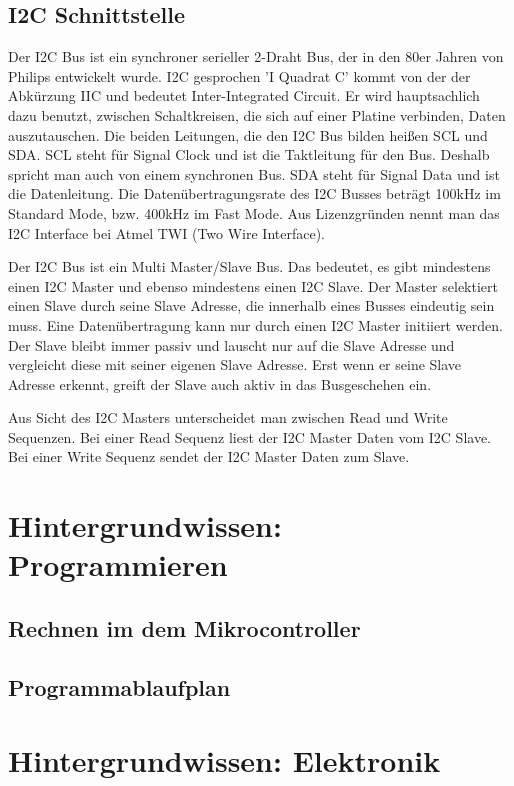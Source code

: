\section{I2C Schnittstelle}

Der I2C Bus ist ein synchroner serieller 2-Draht Bus, der in den 80er Jahren von Philips entwickelt wurde. I2C gesprochen 'I Quadrat C' kommt von der der Abkürzung IIC und bedeutet Inter-Integrated Circuit. Er wird hauptsachlich dazu benutzt, zwischen Schaltkreisen, die sich auf einer Platine verbinden, Daten auszutauschen. Die beiden Leitungen, die den I2C Bus bilden heißen SCL und SDA. SCL steht für Signal Clock und ist die Taktleitung für den Bus. Deshalb spricht man auch von einem synchronen Bus. SDA steht für Signal Data und ist die Datenleitung. Die Datenübertragungsrate des I2C Busses beträgt 100kHz im Standard Mode, bzw. 400kHz im Fast Mode. Aus Lizenzgründen nennt man das I2C Interface bei Atmel TWI (Two Wire Interface).

Der I2C Bus ist ein Multi Master/Slave Bus. Das bedeutet, es gibt mindestens einen I2C Master und ebenso mindestens einen I2C Slave. Der Master selektiert einen Slave durch seine Slave Adresse, die innerhalb eines Busses eindeutig sein muss. Eine Datenübertragung kann nur durch einen I2C Master initiiert werden. Der Slave bleibt immer passiv und lauscht nur auf die Slave Adresse und vergleicht diese mit seiner eigenen Slave Adresse. Erst wenn er seine Slave Adresse erkennt, greift der Slave auch aktiv in das Busgeschehen ein.

Aus Sicht des I2C Masters unterscheidet man zwischen Read und Write Sequenzen. Bei einer Read Sequenz liest der I2C Master Daten vom I2C Slave. Bei einer Write Sequenz sendet der I2C Master Daten zum Slave.



\chapter{Hintergrundwissen: Programmieren}

\section{Rechnen im dem Mikrocontroller}

\section{Programmablaufplan }

\chapter{Hintergrundwissen: Elektronik} \label{ch:anhang_elektronik}

